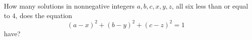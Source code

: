 How many solutions in nonnegative integers $a,b,c,x,y,z$, all six less than or equal to $4$, does the equation
\[
(a-x)^2+(b-y)^2+(c-z)^2=1
\]
have?

